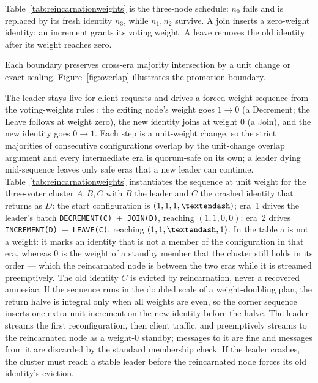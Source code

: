 \documentclass[10pt,journal,letterpaper]{IEEEtran}
\newcommand{\code}[1]{\texttt{#1}}
\begin{document}
Table~\ref{tab:reincarnationweights} is the three-node schedule: $n_0$ fails and is replaced by its fresh identity $n_3$, while $n_1,n_2$ survive. A join inserts a zero-weight identity; an increment grants its voting weight. A leave removes the old identity after its weight reaches zero.

Each boundary preserves cross-era majority intersection by a unit change or exact scaling. Figure~\ref{fig:overlap} illustrates the promotion boundary.

The leader stays live for client requests and drives a forced weight sequence from
the voting-weights rules \cite{votingweights}: the exiting node's weight goes
$1\to0$ (a Decrement; the Leave follows at weight zero), the new identity joins at weight $0$ (a Join), and the new
identity goes $0\to1$. Each step
is a unit-weight change, so the strict majorities of consecutive configurations
overlap by the unit-change overlap argument and every intermediate era is
quorum-safe on its own; a leader dying mid-sequence leaves only safe eras that a
new leader can continue. Table~\ref{tab:reincarnationweights} instantiates the
sequence at unit weight for the three-voter cluster $A,B,C$ with $B$ the leader
and $C$ the crashed identity that returns as $D$: the start configuration is
$(1,1,1,\textendash)$; era~1 drives the leader's batch
\code{DECREMENT(C)}~+~\code{JOIN(D)}, reaching $(1,1,0,0)$; era~2 drives
\code{INCREMENT(D)}~+~\code{LEAVE(C)}, reaching $(1,1,\textendash,1)$. In the
table a \textendash{} is not a weight: it marks an identity that is not a member
of the configuration in that era, whereas $0$ is the weight of a standby member
that the cluster still holds in its order --- which the reincarnated node is
between the two eras while it is streamed preemptively. The old identity $C$ is
evicted by reincarnation, never a recovered amnesiac. If the sequence
runs in the doubled scale of a weight-doubling
plan, the return halve is integral only when all weights are even, so the corner
sequence inserts one extra unit increment on the new identity before the halve. The
leader streams the first reconfiguration, then client traffic, and preemptively
streams to the reincarnated node as a weight-0 standby; messages to it are fine and
messages from it are discarded by the standard membership check. If the leader crashes,
the cluster must reach a stable leader before the reincarnated node forces its old
identity's eviction.
\end{document}
